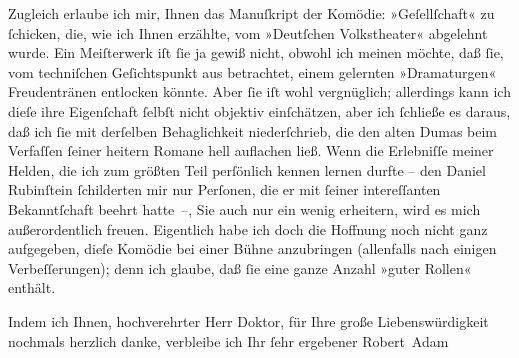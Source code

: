 \pstart
           Zugleich erlaube ich mir, Ihnen das Manuſkript der Komödie: »Geſellſchaft« zu ſchicken, die, wie ich Ihnen erzählte, vom »Deutſchen Volkstheater« abgelehnt wurde. Ein
               Meiſterwerk iſt ſie ja gewiß nicht, obwohl ich meinen möchte, daß ſie, vom
               techniſchen Geſichtspunkt aus betrachtet, einem gelernten »Dramaturgen« Freudentränen
               entlocken könnte. Aber ſie iſt {\pb}wohl
               vergnüglich; allerdings kann ich dieſe ihre Eigenſchaft ſelbſt nicht objektiv
               einſchätzen, aber ich ſchließe es daraus, daß ich ſie mit derſelben Behaglichkeit
               niederſchrieb, die den alten Dumas beim
               Verfaſſen ſeiner heitern Romane hell auflachen ließ. Wenn die Erlebniſſe meiner
               Helden, die ich zum größten Teil perſönlich kennen lernen durfte – den Daniel
               Rubinſtein ſchilderten mir nur Perſonen, die er mit ſeiner intereſſanten
               Bekanntſchaft beehrt hatte –, Sie auch nur ein wenig erheitern, wird es mich
               außerordentlich freuen. Eigentlich habe ich doch die Hoffnung noch nicht ganz
               aufgegeben, dieſe Komödie bei einer Bühne anzubringen (allenfalls nach einigen
               Verbeſſerungen); denn ich glaube, daß ſie eine ganze Anzahl »guter Rollen«
               enthält.\pend
           
\pstart
           Indem ich Ihnen, hochverehrter Herr Doktor, für Ihre große Liebenswürdigkeit nochmals
               herzlich danke, verbleibe ich Ihr ſehr ergebener\pend
           \pstart \spacefill\mbox{Robert Adam}\pend{}\endnumbering{}  
      